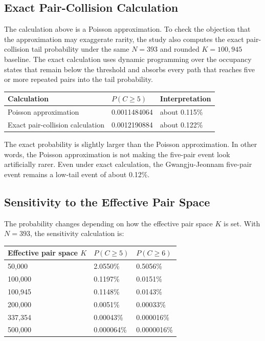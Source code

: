 \documentclass[preprint]{IEIE}
\begin{document}
\subsection{Exact Pair-Collision Calculation}

The calculation above is a Poisson approximation. To check the objection that the approximation may exaggerate rarity, the study also computes the exact pair-collision tail probability under the same \(N=393\) and rounded \(K=100,945\) baseline. The exact calculation uses dynamic programming over the occupancy states that remain below the threshold and absorbs every path that reaches five or more repeated pairs into the tail probability.

\begin{center}
\small
\begin{tabular}{l l l}
\toprule
Calculation & \(P(C \geq 5)\) & Interpretation \\
\midrule
Poisson approximation & 0.0011484064 & about 0.115\% \\
Exact pair-collision calculation & 0.0012190884 & about 0.122\% \\
\bottomrule
\end{tabular}
\end{center}

The exact probability is slightly larger than the Poisson approximation. In other words, the Poisson approximation is not making the five-pair event look artificially rarer. Even under exact calculation, the Gwangju-Jeonnam five-pair event remains a low-tail event of about 0.12\%.

\subsection{Sensitivity to the Effective Pair Space}

The probability changes depending on how the effective pair space \(K\) is set. With \(N=393\), the sensitivity calculation is:

\begin{center}
\small
\begin{tabular}{l l l}
\toprule
Effective pair space \(K\) & \(P(C \geq 5)\) & \(P(C \geq 6)\) \\
\midrule
50,000 & 2.0550\% & 0.5056\% \\
100,000 & 0.1197\% & 0.0151\% \\
100,945 & 0.1148\% & 0.0143\% \\
200,000 & 0.0051\% & 0.00033\% \\
337,354 & 0.00043\% & 0.000016\% \\
500,000 & 0.000064\% & 0.0000016\% \\
\bottomrule
\end{tabular}
\end{center}
\end{document}
